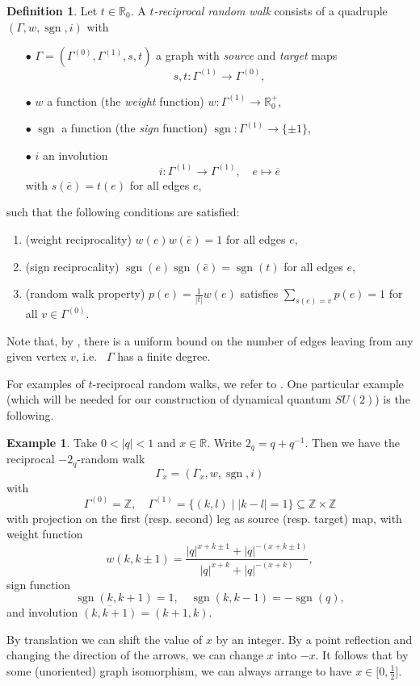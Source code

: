 \documentclass[11pt]{article}
\DeclareMathOperator{\sgn}{\mathrm{sgn}}
\newcommand{\R}{\mathbb{R}}
\newcommand{\Z}{\mathbb{Z}}
\theoremstyle{definition}
\newtheorem{Def}[Theorem]{Definition}
\newtheorem{Exa}[Theorem]{Example}
\numberwithin{equation}{section}
\begin{document}
\begin{Def} Let $t\in \R_0$. A \emph{$t$-reciprocal random walk} consists of a quadruple $(\Gamma,w,\sgn,i)$ with \begin{itemize}
\item[$\bullet$] $\Gamma=(\Gamma^{(0)},\Gamma^{(1)},s,t)$ a graph with \emph{source} and \emph{target} maps \[s,t:\Gamma^{(1)}\rightarrow \Gamma^{(0)},\]
\item[$\bullet$] $w$ a function (the \emph{weight} function) $w:\Gamma^{(1)}\rightarrow \R_0^+$,
\item[$\bullet$] $\sgn$ a function (the \emph{sign} function) $\sgn:\Gamma^{(1)}\rightarrow \{\pm 1\}$,
\item[$\bullet$] $i$ an involution \[i:\Gamma^{(1)} \rightarrow \Gamma^{(1)},\quad e\mapsto \overline{e}\] with $s(\bar{e}) = t(e)$ for all edges $e$,
\end{itemize}
such that the following conditions are satisfied:
\begin{enumerate}[label=(\arabic*)]
\item (weight reciprocality) $w(e)w(\bar{e}) = 1$ for all edges $e$,
\item (sign reciprocality) $\sgn(e)\sgn(\bar{e}) = \sgn(t)$ for all edges $e$,
\item (random walk property) $p(e) = \frac{1}{|t|}w(e)$ satisfies $\sum_{s(e)=v} p(e) = 1$ for all $v\in \Gamma^{(0)}$.
\end{enumerate}
\end{Def}


Note that, by \cite[Proposition 3.1]{DCY1}, there is a uniform bound on the number of edges leaving from any given vertex $v$, i.e.~ $\Gamma$ has a finite degree.

For examples of $t$-reciprocal random walks, we refer to \cite{DCY1}. One particular example (which will be needed for our construction of dynamical quantum $SU(2)$) is the following.

\begin{Exa}\label{ExaGraphPod} Take $0<|q|<1$ and $x\in \R$. Write $2_q = q+q^{-1}$. Then we have the reciprocal $-2_q$-random walk \[\Gamma_x =(\Gamma_x,w,\sgn,i)\] with \[ \Gamma^{(0)} = \Z,\quad \Gamma^{(1)} = \{(k,l)\mid |k-l|= 1\}\subseteq \Z\times \Z\] with projection on the first (resp. second) leg as source (resp. target) map, with weight function \[w(k,k\pm 1) = \frac{|q|^{x+k\pm 1}+|q|^{-(x+k\pm 1)}}{|q|^{x+k}+|q|^{-(x+k)}},\] sign function \[\sgn(k,k+1) = 1,\quad \sgn(k,k-1) = -\sgn(q),\] and involution $\overline{(k,k+1)} = (k+1,k)$. 

By translation we can shift the value of $x$ by an integer. By a point reflection and changing the direction of the arrows, we can change $x$ into $-x$. It follows that by some (unoriented) graph isomorphism, we can always arrange to have $x\in \lbrack 0,\frac{1}{2}\rbrack$.
\end{Exa} 
\end{document}
